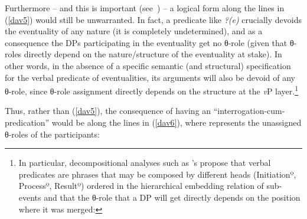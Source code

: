 \documentclass[output=paper]{langsci/langscibook}
\begin{document}
Furthermore -- and this is important (see~) -- a
logical form along the lines in (\ref{dav5}) would still be unwarranted. In
fact, a predicate like \emph{?(e)} crucially devoids the eventuality of any
nature (it is completely undetermined), and as a consequence the DPs
participating in the eventuality get no θ-role (given that
θ-roles directly depend on the nature/structure of the eventuality at
stake). In other words, in the absence of a specific semantic (and structural)
specification for the verbal predicate of eventualities, its arguments will
also be devoid of any θ-role, since θ-role assignment directly
depends on the structure at the \emph{v}P layer.\footnote{In particular,
    decompositional analyses such as \citeauthor{Ramchand2008}'s
    \citeyearpar{Ramchand2008} propose that verbal predicates are phrases that
    may be composed by different heads (Initiationº, Processº, Resultº) ordered
    in the hierarchical embedding relation of sub-events and that the
    θ-role that a DP will get directly depends on the position where it
    was merged:

}

Thus, rather than (\ref{dav5}), the consequence of having an
\enquote{interrogation-cum-pre\-di\-ca\-tion} would be along the lines
in (\ref{dav6}), where \underline{\hspace{1cm}} represents the unassigned
θ-roles of the participants:

\begin{exe}
\end{exe}
\end{document}
